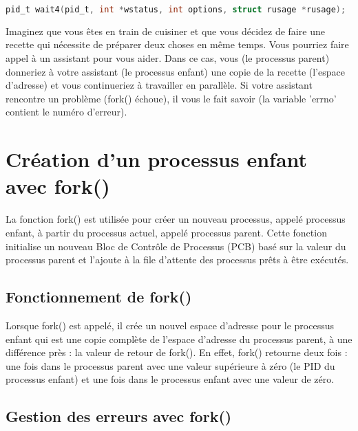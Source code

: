 \documentclass[12pt]{report}
\begin{document}
\begin{lstlisting}[language=C]pid_t wait4(pid_t, int *wstatus, int options, struct rusage *rusage); \end{lstlisting}

\begin{tcolorbox}[  colback=blue!10,  colframe=blue,  title={\fontfamily{lmr}\selectfont \faComment\ Vulgarisation simple},  fonttitle=\bfseries,  fontupper=\fontfamily{lmr}\selectfont,  boxrule=1pt,  sharp corners,]
Imaginez que vous êtes en train de cuisiner et que vous décidez de faire une recette qui nécessite de préparer deux choses en même temps. Vous pourriez faire appel à un assistant pour vous aider. Dans ce cas, vous (le processus parent) donneriez à votre assistant (le processus enfant) une copie de la recette (l'espace d'adresse) et vous continueriez à travailler en parallèle. Si votre assistant rencontre un problème (fork() échoue), il vous le fait savoir (la variable 'errno' contient le numéro d'erreur).
\end{tcolorbox}
\section{Création d'un processus enfant avec fork()} 

La fonction fork() est utilisée pour créer un nouveau processus, appelé processus enfant, à partir du processus actuel, appelé processus parent. Cette fonction initialise un nouveau Bloc de Contrôle de Processus (PCB) basé sur la valeur du processus parent et l'ajoute à la file d'attente des processus prêts à être exécutés. 

\subsection{Fonctionnement de fork()} 

Lorsque fork() est appelé, il crée un nouvel espace d'adresse pour le processus enfant qui est une copie complète de l'espace d'adresse du processus parent, à une différence près : la valeur de retour de fork(). En effet, fork() retourne deux fois : une fois dans le processus parent avec une valeur supérieure à zéro (le PID du processus enfant) et une fois dans le processus enfant avec une valeur de zéro. 

\subsection{Gestion des erreurs avec fork()} 
\end{document}
